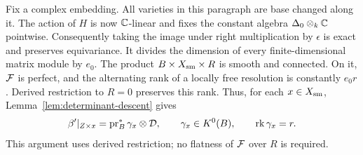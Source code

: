 Fix a complex embedding.  All varieties in this paragraph are
base changed along it.  The action of \(H\) is now \(\mathbb C\)-linear
and fixes the constant algebra \(\Delta_0\otimes_k\mathbb C\) pointwise.
Consequently taking the image under right multiplication by
\(\epsilon\) is exact and preserves equivariance.  It divides the
dimension of every finite-dimensional matrix module by \(e_0\).
The product \(B\times X_{\mathrm{sm}}\times R\) is smooth and connected.
On it, \(\mathcal F\) is perfect, and the alternating rank of a locally
free resolution is constantly \(e_0r\).  Derived restriction to
\(R=0\) preserves this rank.  Thus, for each \(x\in X_{\mathrm{sm}}\),
Lemma~\ref{lem:determinant-descent} gives
\begin{equation}\label{eq:beta-fiber-factorization}
\beta'|_{Z\times x}=\operatorname{pr}_B^*\gamma_x\otimes\mathcal D,
\qquad \gamma_x\in K^0(B),\qquad \operatorname{rk}\gamma_x=r.
\end{equation}
This argument uses derived restriction; no flatness of \(\mathcal F\)
over \(R\) is required.

